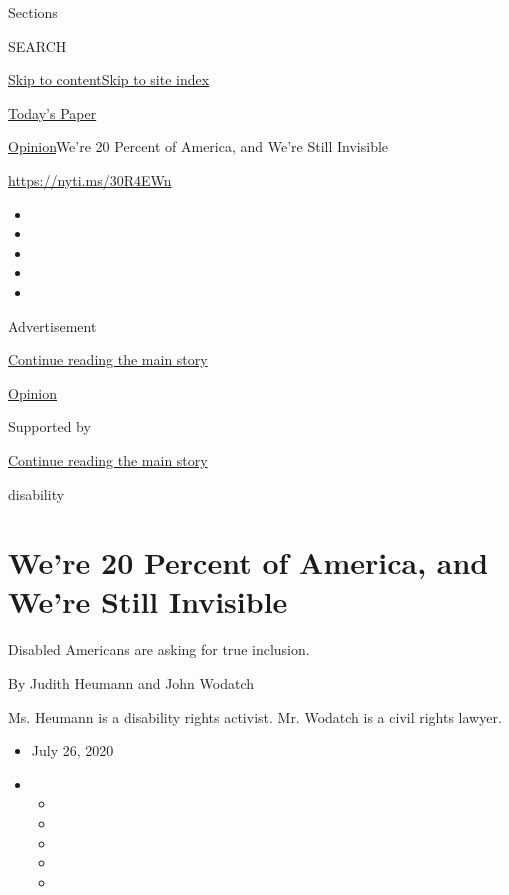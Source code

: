 Sections

SEARCH

\protect\hyperlink{site-content}{Skip to
content}\protect\hyperlink{site-index}{Skip to site index}

\href{https://myaccount.nytimes3xbfgragh.onion/auth/login?response_type=cookie\&client_id=vi}{}

\href{https://www.nytimes3xbfgragh.onion/section/todayspaper}{Today's
Paper}

\href{/section/opinion}{Opinion}\textbar{}We're 20 Percent of America,
and We're Still Invisible

\url{https://nyti.ms/30R4EWn}

\begin{itemize}
\item
\item
\item
\item
\item
\end{itemize}

Advertisement

\protect\hyperlink{after-top}{Continue reading the main story}

\href{/section/opinion}{Opinion}

Supported by

\protect\hyperlink{after-sponsor}{Continue reading the main story}

disability

\hypertarget{were-20-percent-of-america-and-were-still-invisible}{%
\section{We're 20 Percent of America, and We're Still
Invisible}\label{were-20-percent-of-america-and-were-still-invisible}}

Disabled Americans are asking for true inclusion.

By Judith Heumann and John Wodatch

Ms. Heumann is a disability rights activist. Mr. Wodatch is a civil
rights lawyer.

\begin{itemize}
\item
  July 26, 2020
\item
  \begin{itemize}
  \item
  \item
  \item
  \item
  \item
  \end{itemize}
\end{itemize}


